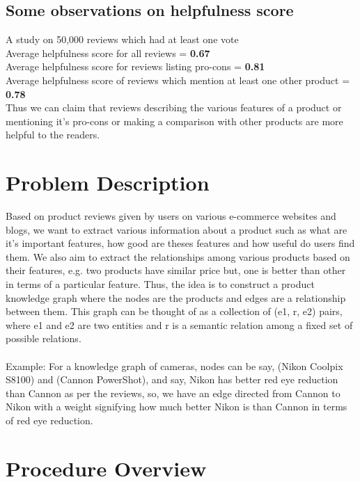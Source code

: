 \documentclass[12pt]{article}
\begin{document}
\subsection{Some observations on helpfulness score}
A study on 50,000 reviews which had at least one vote \\ 
Average helpfulness score for all reviews =  \textbf{0.67}\\ 
Average helpfulness score for reviews listing pro-cons =  \textbf{0.81} \\ 
Average helpfulness score of reviews which mention at least one other product = \textbf{0.78} \\
Thus  we can claim that reviews describing the various features of a product or  mentioning it's pro-cons or making a comparison with other products are more helpful to the readers.


\section{Problem Description}
Based on product reviews given by users on various e-commerce websites and blogs, we want to extract various information about a product such as what are it's important features, how good are theses features and how useful do users find them. We also aim to extract the relationships among various products based on their features, e.g. two products have similar price but, one is better than other in terms of a particular feature. Thus, the idea is to construct a product knowledge graph where the nodes are the products and edges are a relationship between them. This graph can be thought of as a collection of (e1, r, e2) pairs, where e1 and e2 are two entities and r is a semantic relation among a fixed set of possible relations.	\\~\\
\noindent
Example: For a knowledge graph of cameras, nodes can be say, (Nikon Coolpix S8100) and (Cannon PowerShot), and say, Nikon has better red eye reduction than Cannon as per the reviews, so, we have an edge directed from Cannon to Nikon with a weight signifying how much better Nikon is than Cannon in terms of red eye reduction.   

\section{Procedure Overview}
\end{document}
